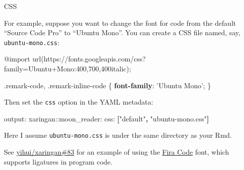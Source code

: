 \documentclass[ignorenonframetext,]{beamer}
\newenvironment{Shaded}{\begin{snugshade}}{\end{snugshade}}
\newcommand{\AttributeTok}[1]{\textcolor[rgb]{0.77,0.63,0.00}{#1}}
\newcommand{\DecValTok}[1]{\textcolor[rgb]{0.00,0.00,0.81}{#1}}
\newcommand{\FunctionTok}[1]{\textcolor[rgb]{0.00,0.00,0.00}{#1}}
\newcommand{\ImportTok}[1]{#1}
\newcommand{\KeywordTok}[1]{\textcolor[rgb]{0.13,0.29,0.53}{\textbf{#1}}}
\newcommand{\NormalTok}[1]{#1}
\newcommand{\StringTok}[1]{\textcolor[rgb]{0.31,0.60,0.02}{#1}}
\begin{document}
\begin{frame}[fragile]{CSS}
\protect\hypertarget{css-1}{}

For example, suppose you want to change the font for code from the
default ``Source Code Pro'' to ``Ubuntu Mono''. You can create a CSS
file named, say, \texttt{ubuntu-mono.css}:

\begin{Shaded}
\begin{Highlighting}[]
\ImportTok{@import}\NormalTok{ url(https://fonts}\DecValTok{.}\NormalTok{googleapis}\DecValTok{.}\NormalTok{com/css?family=Ubuntu+Mono:}\DecValTok{400}\NormalTok{,}\DecValTok{700}\NormalTok{,}\DecValTok{400}\NormalTok{italic);}

\FunctionTok{.remark-code}\NormalTok{, }\FunctionTok{.remark-inline-code}\NormalTok{ \{ }\KeywordTok{font-family}\NormalTok{: }\StringTok{'Ubuntu Mono'}\NormalTok{; \}}
\end{Highlighting}
\end{Shaded}

Then set the \texttt{css} option in the YAML metadata:

\begin{Shaded}
\begin{Highlighting}[]
\FunctionTok{output:}
  \FunctionTok{xaringan:}\AttributeTok{:moon_reader:}
    \FunctionTok{css:}\AttributeTok{ }\KeywordTok{[}\StringTok{"default"}\KeywordTok{,} \StringTok{"ubuntu-mono.css"}\KeywordTok{]}
\end{Highlighting}
\end{Shaded}

Here I assume \texttt{ubuntu-mono.css} is under the same directory as
your Rmd.

See
\href{https://github.com/yihui/xaringan/issues/83}{yihui/xaringan\#83}
for an example of using the
\href{https://github.com/tonsky/FiraCode}{Fira Code} font, which
supports ligatures in program code.

\end{frame}
\end{document}
